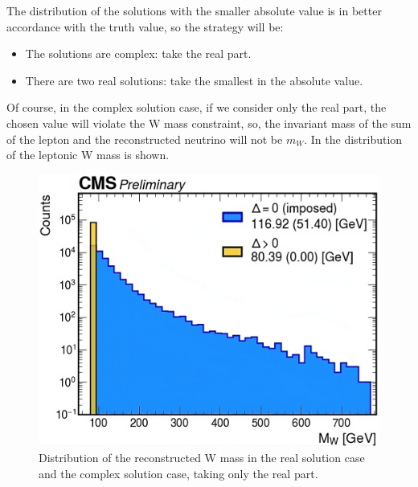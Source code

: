The distribution of the solutions with the smaller absolute value is in better accordance with the truth value, so the strategy will be:\\
\begin{minipage}{\linewidth}
    \begin{minipage}{0.42\linewidth}

\begin{itemize}
    \item The solutions are complex: take the real part.
    \item There are two real solutions: take the smallest in the absolute value.
\end{itemize}

        Of course, in the complex solution case, if we consider only the real part, the chosen value will violate the W mass constraint, so, the invariant mass of the sum of the lepton and the reconstructed neutrino will not be $m_W$. In   the distribution of the leptonic W mass is shown.
    \end{minipage}
    \hfill
    \begin{minipage}{0.55\linewidth}
    \vspace{-0.2cm}
    \begin{figure}[H]
    \centering
    \includegraphics[width=\linewidth]{fig//chap07-selection/Wmass_reconstructed.png}
    \caption{Distribution of the reconstructed W mass in the real solution case and the complex solution case, taking only the real part.}
    \label{fig:LeptW_reco}
\end{figure}
        
    \end{minipage}

\end{minipage}


